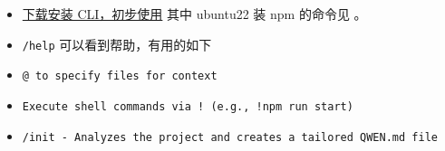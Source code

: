 
\begin{itemize}
\item \href{https://help.aliyun.com/zh/model-studio/qwen-code#bfe3dff25ecxb}{下载安装 CLI，初步使用} 其中 ubuntu22 装 npm 的命令见 。
\item \verb`/help` 可以看到帮助，有用的如下
\item \verb`@ to specify files for context`
\item \verb`Execute shell commands via ! (e.g., !npm run start)`
\item \verb`/init - Analyzes the project and creates a tailored QWEN.md file`
\end{itemize}

